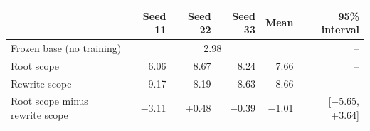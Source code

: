 \begin{tabularx}{\textwidth}{@{}Xrrrrr@{}}
\toprule
 & Seed 11 & Seed 22 & Seed 33 & Mean & 95\% interval \\
\midrule
Frozen base (no training) & \multicolumn{4}{c}{2.98} & -- \\
Root scope & 6.06 & 8.67 & 8.24 & 7.66 & -- \\
Rewrite scope & 9.17 & 8.19 & 8.63 & 8.66 & -- \\
\midrule
Root scope minus rewrite scope & $-$3.11 & +0.48 & $-$0.39 & $-$1.01 & [$-$5.65, +3.64] \\
\bottomrule
\end{tabularx}

